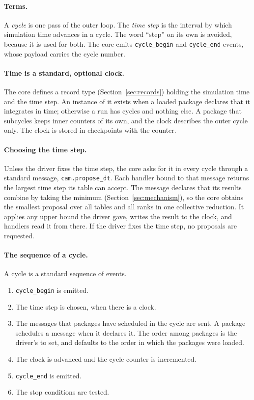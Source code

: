 \documentclass[11pt,a4paper]{article}
\newcommand{\code}[1]{\texttt{#1}}
\begin{document}
\paragraph{Terms.}  A \emph{cycle} is one pass of the outer loop.  The
\emph{time step} is the interval by which simulation time advances in a
cycle.  The word \enquote{step} on its own is avoided, because it is used
for both.  The core emits \code{cycle\_begin} and \code{cycle\_end} events,
whose payload carries the cycle number.

\paragraph{Time is a standard, optional clock.}  The core defines a record
type (Section~\ref{sec:records}) holding the simulation time and the time
step.  An instance of it exists when a loaded package declares that it
integrates in time; otherwise a run has cycles and nothing else.  A package
that subcycles keeps inner counters of its own, and the clock describes the
outer cycle only.  The clock is stored in checkpoints with the counter.

\paragraph{Choosing the time step.}  Unless the driver fixes the time step,
the core asks for it in every cycle through a standard message,
\code{cam.propose\_dt}.  Each handler bound to that message returns the
largest time step its table can accept.  The message declares that its
results combine by taking the minimum (Section~\ref{sec:mechanism}), so the
core obtains the smallest proposal over all tables and all ranks in one
collective reduction.  It applies any upper bound the driver gave, writes
the result to the clock, and handlers read it from there.  If the driver
fixes the time step, no proposals are requested.

\paragraph{The sequence of a cycle.}  A cycle is a standard sequence of
events.

\begin{enumerate}
  \item \code{cycle\_begin} is emitted.
  \item The time step is chosen, when there is a clock.
  \item The messages that packages have scheduled in the cycle are sent.  A
        package schedules a message when it declares it.  The order among
        packages is the driver's to set, and defaults to the order in which
        the packages were loaded.
  \item The clock is advanced and the cycle counter is incremented.
  \item \code{cycle\_end} is emitted.
  \item The stop conditions are tested.
\end{enumerate}
\end{document}
